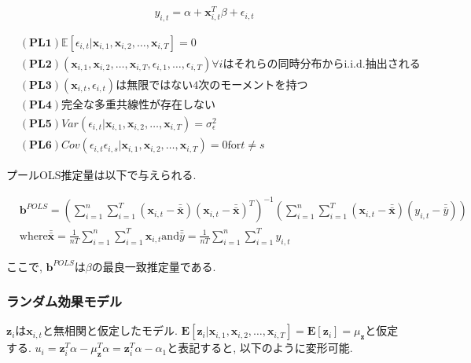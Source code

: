 \documentclass[paper=a4paper,fontsize=10pt]{jlreq}
\begin{document}
\begin{equation*}
  y_{i,t} = \alpha + \mathbf{x}_{i,t}^T \beta + \epsilon_{i,t}
\end{equation*}

\begin{align*}
  &\mathbf{(PL1)}　\mathbb{E}[\epsilon_{i,t}|\mathbf{x}_{i,1}, \mathbf{x}_{i,2}, \dots, \mathbf{x}_{i,T}]=0\\
  &\mathbf{(PL2)}　(\mathbf{x}_{i,1}, \mathbf{x}_{i,2}, \dots, \mathbf{x}_{i,T}, \epsilon_{i,1}, \dots, \epsilon_{i,T}) \forall i\text{はそれらの同時分布からi.i.d.抽出される}\\
  &\mathbf{(PL3)}　(\mathbf{x}_{i,t}, \epsilon_{i,t})\text{は無限ではない4次のモーメントを持つ}\\
  &\mathbf{(PL4)}　\text{完全な多重共線性が存在しない}\\
  &\mathbf{(PL5)}　Var(\epsilon_{i,t}|\mathbf{x}_{i,1}, \mathbf{x}_{i,2}, \dots, \mathbf{x}_{i,T}) = \sigma_\epsilon^2\\
  &\mathbf{(PL6)}　Cov(\epsilon_{i,t}\epsilon_{i,s}|\mathbf{x}_{i,1}, \mathbf{x}_{i,2}, \dots, \mathbf{x}_{i,T}) = 0　\text{for}　t \neq s
\end{align*}

プールOLS推定量は以下で与えられる.

\begin{align*}
  &\mathbf{b}^{POLS} = (\sum_{i=1}^{n}\sum_{i=1}^{T}(\mathbf{x}_{i,t} - \bar{\bar{\mathbf{x}}})(\mathbf{x}_{i,t} - \bar{\bar{\mathbf{x}}})^T)^{-1} (\sum_{i=1}^{n}\sum_{i=1}^{T}(\mathbf{x}_{i,t} - \bar{\bar{\mathbf{x}}})(y_{i,t} - \bar{\bar{y}}))\\
  &\text{where}　\bar{\bar{\mathbf{x}}} = \frac{1}{nT}\sum_{i=1}^{n}\sum_{i=1}^{T}\mathbf{x}_{i,t}　\text{and}　\bar{\bar{y}} = \frac{1}{nT}\sum_{i=1}^{n}\sum_{i=1}^{T}y_{i,t}
\end{align*}

ここで, $\mathbf{b}^{POLS}$は$\beta$の最良一致推定量である.\\

\subsubsection{ランダム効果モデル}
$\mathbf{z}_i$は$\mathbf{x}_{i,t}$と無相関と仮定したモデル. $\mathbf{E}[\mathbf{z}_{i}|\mathbf{x}_{i,1}, \mathbf{x}_{i,2}, \dots, \mathbf{x}_{i,T}] = \mathbf{E}[\mathbf{z}_{i}] = \mu_{\mathbf{z}}$と仮定する. ${u}_i = \mathbf{z}_{i}^T \alpha - \mu_{\mathbf{z}}^T \alpha = \mathbf{z}_{i}^T \alpha - \alpha_1$と表記すると, 以下のように変形可能. 
\end{document}
